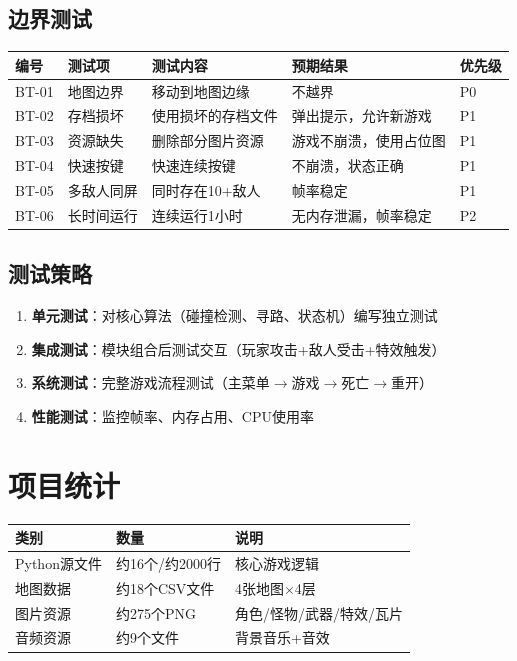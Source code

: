 \documentclass[12pt,a4paper]{article}
\begin{document}
\subsection{边界测试}

\begin{longtable}{p{0.5cm}p{2.5cm}p{5cm}p{2cm}p{2cm}}
\toprule
\textbf{编号} & \textbf{测试项} & \textbf{测试内容} & \textbf{预期结果} & \textbf{优先级} \\
\midrule
\endhead
BT-01 & 地图边界 & 移动到地图边缘 & 不越界 & P0 \\
BT-02 & 存档损坏 & 使用损坏的存档文件 & 弹出提示，允许新游戏 & P1 \\
BT-03 & 资源缺失 & 删除部分图片资源 & 游戏不崩溃，使用占位图 & P1 \\
BT-04 & 快速按键 & 快速连续按键 & 不崩溃，状态正确 & P1 \\
BT-05 & 多敌人同屏 & 同时存在10+敌人 & 帧率稳定 & P1 \\
BT-06 & 长时间运行 & 连续运行1小时 & 无内存泄漏，帧率稳定 & P2 \\
\bottomrule
\end{longtable}

\subsection{测试策略}

\begin{enumerate}[leftmargin=2em]
    \item \textbf{单元测试}：对核心算法（碰撞检测、寻路、状态机）编写独立测试
    \item \textbf{集成测试}：模块组合后测试交互（玩家攻击+敌人受击+特效触发）
    \item \textbf{系统测试}：完整游戏流程测试（主菜单$\rightarrow$游戏$\rightarrow$死亡$\rightarrow$重开）
    \item \textbf{性能测试}：监控帧率、内存占用、CPU使用率
\end{enumerate}


\section{项目统计}

\begin{table}[htbp]
\centering
\begin{tabularx}{\textwidth}{lXX}
\toprule
\textbf{类别} & \textbf{数量} & \textbf{说明} \\
\midrule
Python源文件 & 约16个/约2000行 & 核心游戏逻辑 \\
地图数据 & 约18个CSV文件 & 4张地图$\times$4层 \\
图片资源 & 约275个PNG & 角色/怪物/武器/特效/瓦片 \\
音频资源 & 约9个文件 & 背景音乐+音效 \\
\bottomrule
\end{tabularx}
\end{table}
\end{document}

